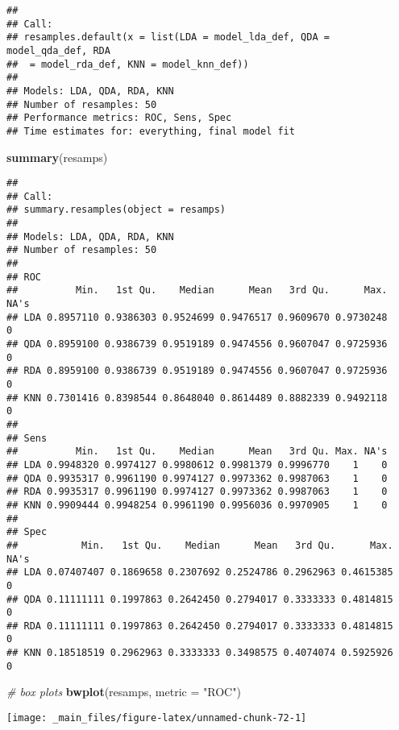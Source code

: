 \documentclass[]{book}
\newenvironment{Shaded}{\begin{snugshade}}{\end{snugshade}}
\newcommand{\CommentTok}[1]{\textcolor[rgb]{0.56,0.35,0.01}{\textit{#1}}}
\newcommand{\DataTypeTok}[1]{\textcolor[rgb]{0.13,0.29,0.53}{#1}}
\newcommand{\KeywordTok}[1]{\textcolor[rgb]{0.13,0.29,0.53}{\textbf{#1}}}
\newcommand{\NormalTok}[1]{#1}
\newcommand{\StringTok}[1]{\textcolor[rgb]{0.31,0.60,0.02}{#1}}
\begin{document}
\begin{verbatim}
## 
## Call:
## resamples.default(x = list(LDA = model_lda_def, QDA = model_qda_def, RDA
##  = model_rda_def, KNN = model_knn_def))
## 
## Models: LDA, QDA, RDA, KNN 
## Number of resamples: 50 
## Performance metrics: ROC, Sens, Spec 
## Time estimates for: everything, final model fit
\end{verbatim}

\begin{Shaded}
\begin{Highlighting}[]
\KeywordTok{summary}\NormalTok{(resamps)}
\end{Highlighting}
\end{Shaded}

\begin{verbatim}
## 
## Call:
## summary.resamples(object = resamps)
## 
## Models: LDA, QDA, RDA, KNN 
## Number of resamples: 50 
## 
## ROC 
##          Min.   1st Qu.    Median      Mean   3rd Qu.      Max. NA's
## LDA 0.8957110 0.9386303 0.9524699 0.9476517 0.9609670 0.9730248    0
## QDA 0.8959100 0.9386739 0.9519189 0.9474556 0.9607047 0.9725936    0
## RDA 0.8959100 0.9386739 0.9519189 0.9474556 0.9607047 0.9725936    0
## KNN 0.7301416 0.8398544 0.8648040 0.8614489 0.8882339 0.9492118    0
## 
## Sens 
##          Min.   1st Qu.    Median      Mean   3rd Qu. Max. NA's
## LDA 0.9948320 0.9974127 0.9980612 0.9981379 0.9996770    1    0
## QDA 0.9935317 0.9961190 0.9974127 0.9973362 0.9987063    1    0
## RDA 0.9935317 0.9961190 0.9974127 0.9973362 0.9987063    1    0
## KNN 0.9909444 0.9948254 0.9961190 0.9956036 0.9970905    1    0
## 
## Spec 
##           Min.   1st Qu.    Median      Mean   3rd Qu.      Max. NA's
## LDA 0.07407407 0.1869658 0.2307692 0.2524786 0.2962963 0.4615385    0
## QDA 0.11111111 0.1997863 0.2642450 0.2794017 0.3333333 0.4814815    0
## RDA 0.11111111 0.1997863 0.2642450 0.2794017 0.3333333 0.4814815    0
## KNN 0.18518519 0.2962963 0.3333333 0.3498575 0.4074074 0.5925926    0
\end{verbatim}

\begin{Shaded}
\begin{Highlighting}[]
\CommentTok{# box plots}
\KeywordTok{bwplot}\NormalTok{(resamps, }\DataTypeTok{metric =} \StringTok{"ROC"}\NormalTok{)}
\end{Highlighting}
\end{Shaded}

\begin{center}\texttt{[image: \_main\_files/figure-latex/unnamed-chunk-72-1]} \end{center}
\end{document}
